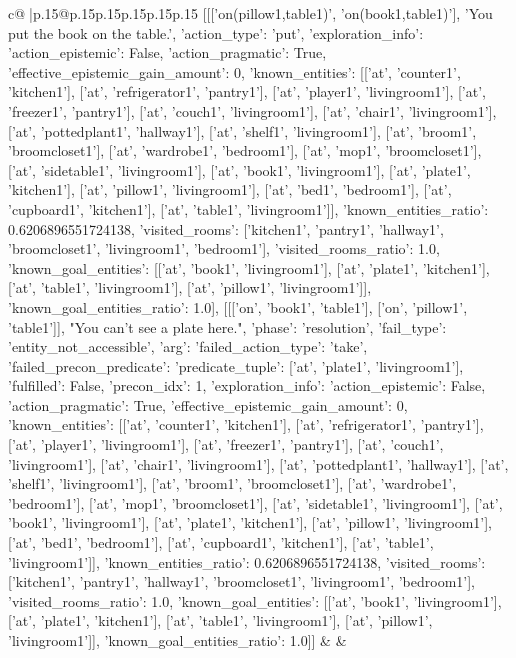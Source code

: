 \documentclass{article}
\begin{document}
{\begin{supertabular}{c@{$\;$}|p{.15\linewidth}@{}p{.15\linewidth}p{.15\linewidth}p{.15\linewidth}p{.15\linewidth}p{.15\linewidth}}
{{{	 [[['on(pillow1,table1)', 'on(book1,table1)'], 'You put the book on the table.', {'action_type': 'put', 'exploration_info': {'action_epistemic': False, 'action_pragmatic': True, 'effective_epistemic_gain_amount': 0, 'known_entities': [['at', 'counter1', 'kitchen1'], ['at', 'refrigerator1', 'pantry1'], ['at', 'player1', 'livingroom1'], ['at', 'freezer1', 'pantry1'], ['at', 'couch1', 'livingroom1'], ['at', 'chair1', 'livingroom1'], ['at', 'pottedplant1', 'hallway1'], ['at', 'shelf1', 'livingroom1'], ['at', 'broom1', 'broomcloset1'], ['at', 'wardrobe1', 'bedroom1'], ['at', 'mop1', 'broomcloset1'], ['at', 'sidetable1', 'livingroom1'], ['at', 'book1', 'livingroom1'], ['at', 'plate1', 'kitchen1'], ['at', 'pillow1', 'livingroom1'], ['at', 'bed1', 'bedroom1'], ['at', 'cupboard1', 'kitchen1'], ['at', 'table1', 'livingroom1']], 'known_entities_ratio': 0.6206896551724138, 'visited_rooms': ['kitchen1', 'pantry1', 'hallway1', 'broomcloset1', 'livingroom1', 'bedroom1'], 'visited_rooms_ratio': 1.0, 'known_goal_entities': [['at', 'book1', 'livingroom1'], ['at', 'plate1', 'kitchen1'], ['at', 'table1', 'livingroom1'], ['at', 'pillow1', 'livingroom1']], 'known_goal_entities_ratio': 1.0}}], [[['on', 'book1', 'table1'], ['on', 'pillow1', 'table1']], "You can't see a plate here.", {'phase': 'resolution', 'fail_type': 'entity_not_accessible', 'arg': {'failed_action_type': 'take', 'failed_precon_predicate': {'predicate_tuple': ['at', 'plate1', 'livingroom1'], 'fulfilled': False, 'precon_idx': 1}}, 'exploration_info': {'action_epistemic': False, 'action_pragmatic': True, 'effective_epistemic_gain_amount': 0, 'known_entities': [['at', 'counter1', 'kitchen1'], ['at', 'refrigerator1', 'pantry1'], ['at', 'player1', 'livingroom1'], ['at', 'freezer1', 'pantry1'], ['at', 'couch1', 'livingroom1'], ['at', 'chair1', 'livingroom1'], ['at', 'pottedplant1', 'hallway1'], ['at', 'shelf1', 'livingroom1'], ['at', 'broom1', 'broomcloset1'], ['at', 'wardrobe1', 'bedroom1'], ['at', 'mop1', 'broomcloset1'], ['at', 'sidetable1', 'livingroom1'], ['at', 'book1', 'livingroom1'], ['at', 'plate1', 'kitchen1'], ['at', 'pillow1', 'livingroom1'], ['at', 'bed1', 'bedroom1'], ['at', 'cupboard1', 'kitchen1'], ['at', 'table1', 'livingroom1']], 'known_entities_ratio': 0.6206896551724138, 'visited_rooms': ['kitchen1', 'pantry1', 'hallway1', 'broomcloset1', 'livingroom1', 'bedroom1'], 'visited_rooms_ratio': 1.0, 'known_goal_entities': [['at', 'book1', 'livingroom1'], ['at', 'plate1', 'kitchen1'], ['at', 'table1', 'livingroom1'], ['at', 'pillow1', 'livingroom1']], 'known_goal_entities_ratio': 1.0}}]] 
	  } 
	   } 
	   } 
	 & & \\ 
 


\end{supertabular}}
\end{document}
